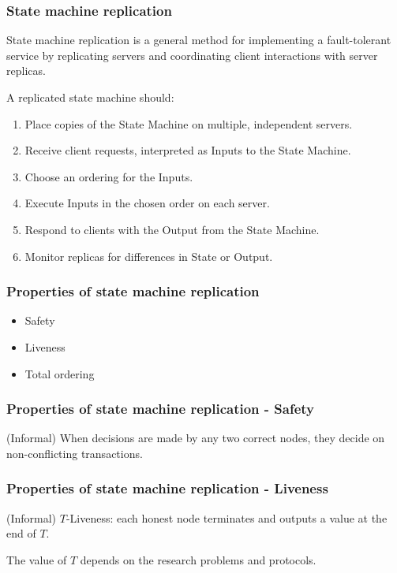 \documentclass{beamer}
\begin{document}
\begin{frame}
\frametitle{State machine replication}

State machine replication is a general method for implementing a fault-tolerant service by replicating servers and coordinating client interactions with server replicas.

A replicated state machine should:

\begin{enumerate}
    \item Place copies of the State Machine on multiple, independent servers.
    \item Receive client requests, interpreted as Inputs to the State Machine.
    \item Choose an ordering for the Inputs.
    \item Execute Inputs in the chosen order on each server.
    \item Respond to clients with the Output from the State Machine.
    \item Monitor replicas for differences in State or Output.
\end{enumerate}




\end{frame}

\begin{frame}
    \frametitle{Properties of state machine replication}

    \begin{itemize}
        \item Safety
        \item Liveness
        \item Total ordering
    \end{itemize}

\end{frame}

\begin{frame}
\frametitle{Properties of state machine replication - Safety}

(Informal) When decisions are made by any two correct nodes, they decide on non-conflicting transactions.

\end{frame}

\begin{frame}
\frametitle{Properties of state machine replication - Liveness}

(Informal) $T$-Liveness: each honest node terminates and outputs a value at the end of $T$.

The value of $T$ depends on the research problems and protocols.

\end{frame}
\end{document}
